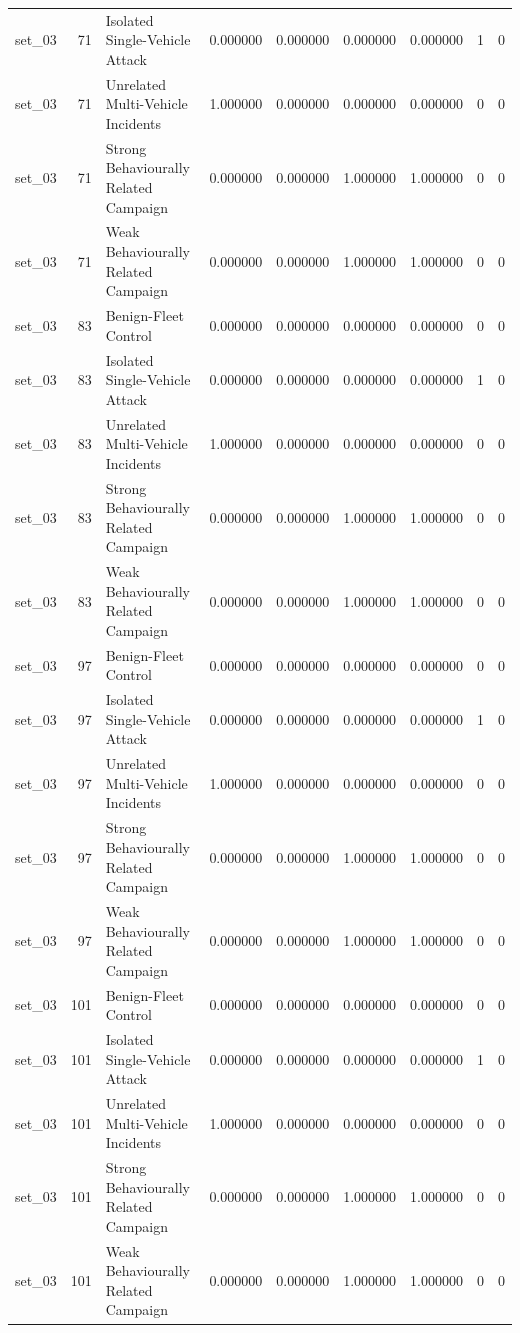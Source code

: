 \begin{tabular}{lrlrrrrrr}
set_03 & 71 & Isolated Single-Vehicle Attack & 0.000000 & 0.000000 & 0.000000 & 0.000000 & 1 & 0 \\
set_03 & 71 & Unrelated Multi-Vehicle Incidents & 1.000000 & 0.000000 & 0.000000 & 0.000000 & 0 & 0 \\
set_03 & 71 & Strong Behaviourally Related Campaign & 0.000000 & 0.000000 & 1.000000 & 1.000000 & 0 & 0 \\
set_03 & 71 & Weak Behaviourally Related Campaign & 0.000000 & 0.000000 & 1.000000 & 1.000000 & 0 & 0 \\
set_03 & 83 & Benign-Fleet Control & 0.000000 & 0.000000 & 0.000000 & 0.000000 & 0 & 0 \\
set_03 & 83 & Isolated Single-Vehicle Attack & 0.000000 & 0.000000 & 0.000000 & 0.000000 & 1 & 0 \\
set_03 & 83 & Unrelated Multi-Vehicle Incidents & 1.000000 & 0.000000 & 0.000000 & 0.000000 & 0 & 0 \\
set_03 & 83 & Strong Behaviourally Related Campaign & 0.000000 & 0.000000 & 1.000000 & 1.000000 & 0 & 0 \\
set_03 & 83 & Weak Behaviourally Related Campaign & 0.000000 & 0.000000 & 1.000000 & 1.000000 & 0 & 0 \\
set_03 & 97 & Benign-Fleet Control & 0.000000 & 0.000000 & 0.000000 & 0.000000 & 0 & 0 \\
set_03 & 97 & Isolated Single-Vehicle Attack & 0.000000 & 0.000000 & 0.000000 & 0.000000 & 1 & 0 \\
set_03 & 97 & Unrelated Multi-Vehicle Incidents & 1.000000 & 0.000000 & 0.000000 & 0.000000 & 0 & 0 \\
set_03 & 97 & Strong Behaviourally Related Campaign & 0.000000 & 0.000000 & 1.000000 & 1.000000 & 0 & 0 \\
set_03 & 97 & Weak Behaviourally Related Campaign & 0.000000 & 0.000000 & 1.000000 & 1.000000 & 0 & 0 \\
set_03 & 101 & Benign-Fleet Control & 0.000000 & 0.000000 & 0.000000 & 0.000000 & 0 & 0 \\
set_03 & 101 & Isolated Single-Vehicle Attack & 0.000000 & 0.000000 & 0.000000 & 0.000000 & 1 & 0 \\
set_03 & 101 & Unrelated Multi-Vehicle Incidents & 1.000000 & 0.000000 & 0.000000 & 0.000000 & 0 & 0 \\
set_03 & 101 & Strong Behaviourally Related Campaign & 0.000000 & 0.000000 & 1.000000 & 1.000000 & 0 & 0 \\
set_03 & 101 & Weak Behaviourally Related Campaign & 0.000000 & 0.000000 & 1.000000 & 1.000000 & 0 & 0 \\

\end{tabular}
